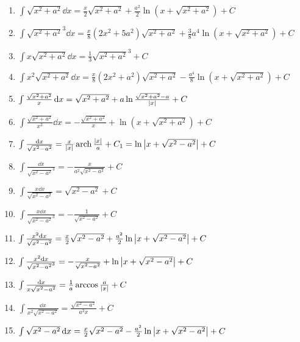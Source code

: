 \begin{enumerate}
\item \(\int \sqrt{x^2+a^2} \dd{x} = \frac{x}{2} \sqrt{x^2+a^2} + \frac{a^2}{2} \ln(x+\sqrt{x^2+a^2}) + C\)

\item \(\int \sqrt{x^2+a^2}^3 \dd{x} = \frac{x}{8} (2x^2+5a^2) \sqrt{x^2+a^2} + \frac{3}{8} a^4 \ln(x+\sqrt{x^2+a^2}) + C\)

\item \(\int x\sqrt{x^2+a^2} \dd{x} = \frac{1}{3} \sqrt{x^2+a^2}^3 + C\)

\item \(\int x^2\sqrt{x^2+a^2} \dd{x} = \frac{x}{8} (2x^2+a^2) \sqrt{x^2+a^2} - \frac{a^4}{8} \ln(x+\sqrt{x^2+a^2}) + C\)

\item \(\int \frac{\sqrt{x^2+a^2}}{x} \dd{x} = \sqrt{x^2+a^2} + a\ln\frac{\sqrt{x^2+a^2}-a}{\abs{x}} + C\)

\item \(\int \frac{\sqrt{x^2+a^2}}{x^2} \dd{x} = -\frac{\sqrt{x^2+a^2}}{x} + \ln(x+\sqrt{x^2+a^2}) + C\)

\item \(\int \frac{\dd{x}}{\sqrt{x^2-a^2}} = \frac{x}{\abs{x}} \operatorname{arch}\frac{\abs{x}}{a} + C_1
= \ln\abs{x+\sqrt{x^2-a^2}} + C\)

\item \(\int \frac{\dd{x}}{\sqrt{x^2-a^2}^3} = -\frac{x}{a^2\sqrt{x^2-a^2}} + C\)

\item \(\int \frac{x \dd{x}}{\sqrt{x^2-a^2}} = \sqrt{x^2-a^2} + C\)

\item \(\int \frac{x \dd{x}}{\sqrt{x^2-a^2}^3} = -\frac{1}{\sqrt{x^2-a^2}} + C\)

\item \(\int \frac{x^2 \dd{x}}{\sqrt{x^2-a^2}} = \frac{x}{2} \sqrt{x^2-a^2} + \frac{a^2}{2} \ln\abs{x+\sqrt{x^2-a^2}} + C\)

\item \(\int \frac{x^2 \dd{x}}{\sqrt{x^2-a^2}^3} = -\frac{x}{\sqrt{x^2-a^2}} + \ln\abs{x+\sqrt{x^2-a^2}} + C\)

\item \(\int \frac{\dd{x}}{x\sqrt{x^2-a^2}} = \frac{1}{a} \arccos\frac{a}{\abs{x}} + C\)

\item \(\int \frac{\dd{x}}{x^2\sqrt{x^2-a^2}} = \frac{\sqrt{x^2-a^2}}{a^2 x} + C\)

\item \(\int \sqrt{x^2-a^2} \dd{x} = \frac{x}{2} \sqrt{x^2-a^2} - \frac{a^2}{2} \ln\abs{x+\sqrt{x^2-a^2}} + C\)


\end{enumerate}
